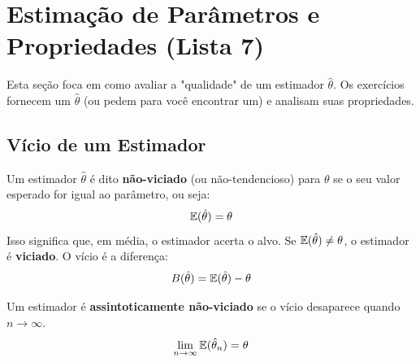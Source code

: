 \section{Estimação de Parâmetros e Propriedades (Lista 7)}
\label{sec:propriedades}

Esta seção foca em como avaliar a "qualidade" de um estimador $\hat{\theta}$. Os exercícios fornecem um $\hat{\theta}$ (ou pedem para você encontrar um) e analisam suas propriedades.

\subsection{Vício de um Estimador}
\begin{definicao}
Um estimador $\hat{\theta}$ é dito \textbf{não-viciado} (ou não-tendencioso) para $\theta$ se o seu valor esperado for igual ao parâmetro, ou seja:
$$ \mathbb{E}(\hat{\theta}) = \theta $$
Isso significa que, em média, o estimador acerta o alvo. Se $\mathbb{E}(\hat{\theta}) \neq \theta$, o estimador é \textbf{viciado}.
O vício é a diferença:
$$ B(\hat{\theta}) = \mathbb{E}(\hat{\theta}) - \theta $$
\end{definicao}

\begin{propriedade}
Um estimador é \textbf{assintoticamente não-viciado} se o vício desaparece quando $n \to \infty$.
$$ \lim_{n \to \infty} \mathbb{E}(\hat{\theta}_n) = \theta $$
\end{propriedade}

